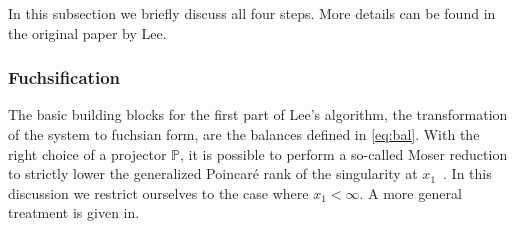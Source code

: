 \documentclass[12pt]{article}
\numberwithin{equation}{section}
\numberwithin{figure}{section}
\renewcommand{\P}{\mathds{P}}
\begin{document}
      In this subsection we briefly discuss all four steps.
      More details can be found in the original paper by Lee\cite{Lee:2014ioa}.

      \subsubsection*{Fuchsification}
        The basic building blocks for the first part of Lee's algorithm, the transformation of the system to fuchsian form, are the balances defined in \eqref{eq:bal}.
        With the right choice of a projector $\P$, it is possible to perform a so-called Moser reduction to strictly lower the generalized Poincar\'{e} rank of the singularity at $x_1$~\cite{Moser:1959}.
        In this discussion we restrict ourselves to the case where $x_1<\infty$.
        A more general treatment is given in\cite{Lee:2014ioa}.
        
\end{document}
